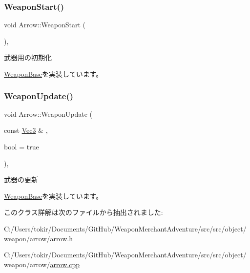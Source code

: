 \mbox{\label{class_arrow_a085b5bd5f9e3ce25a081b502f9989f33}} 
\subsubsection{\texorpdfstring{Weapon\+Start()}{WeaponStart()}}
{\footnotesize\ttfamily void Arrow\+::\+Weapon\+Start (\begin{DoxyParamCaption}{ }\end{DoxyParamCaption})\hspace{0.3cm}{\ttfamily [final]}, {\ttfamily [virtual]}}



武器用の初期化 



\mbox{\hyperlink{class_weapon_base_a25cd4c351638b76377e93341a9545712}{Weapon\+Base}}を実装しています。

\mbox{\label{class_arrow_afb6110035cba7b850d12755570163b29}} 
\subsubsection{\texorpdfstring{Weapon\+Update()}{WeaponUpdate()}}
{\footnotesize\ttfamily void Arrow\+::\+Weapon\+Update (\begin{DoxyParamCaption}\item[{const \mbox{\hyperlink{common_8h_ab1cb35b3a17c398d8ef71d5f779808bf}{Vec3}} \&}]{,  }\item[{bool}]{ = {\ttfamily true} }\end{DoxyParamCaption})\hspace{0.3cm}{\ttfamily [final]}, {\ttfamily [virtual]}}



武器の更新 



\mbox{\hyperlink{class_weapon_base_aa1e3d02353273ab72a71cc3a1563636a}{Weapon\+Base}}を実装しています。



このクラス詳解は次のファイルから抽出されました\+:\begin{DoxyCompactItemize}
\item 
C\+:/\+Users/tokir/\+Documents/\+Git\+Hub/\+Weapon\+Merchant\+Adventure/src/src/object/weapon/arrow/\mbox{\hyperlink{arrow_8h}{arrow.\+h}}\item 
C\+:/\+Users/tokir/\+Documents/\+Git\+Hub/\+Weapon\+Merchant\+Adventure/src/src/object/weapon/arrow/\mbox{\hyperlink{arrow_8cpp}{arrow.\+cpp}}\end{DoxyCompactItemize}
